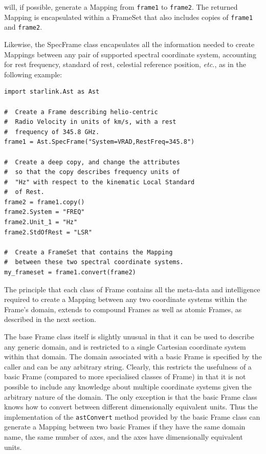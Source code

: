 \documentclass[final,authoryear,5p,times,twocolumn]{elsarticle}
\begin{document}
will, if possible, generate a Mapping from \texttt{frame1} to
\texttt{frame2}. The returned Mapping is encapsulated within a FrameSet that
also includes copies of \texttt{frame1} and \texttt{frame2}.

Likewise, the SpecFrame class encapsulates all the information needed to
create Mappings between any pair of supported spectral coordinate system,
accounting for rest frequency, standard of rest, celestial reference position,
\emph{etc.}, as in the following example:

\begin{lstlisting}
import starlink.Ast as Ast

#  Create a Frame describing helio-centric
#  Radio Velocity in units of km/s, with a rest
#  frequency of 345.8 GHz.
frame1 = Ast.SpecFrame("System=VRAD,RestFreq=345.8")

#  Create a deep copy, and change the attributes
#  so that the copy describes frequency units of
#  "Hz" with respect to the kinematic Local Standard
#  of Rest.
frame2 = frame1.copy()
frame2.System = "FREQ"
frame2.Unit_1 = "Hz"
frame2.StdOfRest = "LSR"

#  Create a FrameSet that contains the Mapping
#  between these two spectral coordinate systems.
my_frameset = frame1.convert(frame2)
\end{lstlisting}

The principle that each class of Frame contains all the meta-data and
intelligence required to create a Mapping between any two coordinate
systems within the Frame's domain, extends to compound Frames as well as
atomic Frames, as described in the next section.

The base Frame class itself is slightly unusual in that it can be used to
describe any generic domain, and is restricted to a single Cartesian
coordinate system within that domain. The domain associated with a basic
Frame is specified by the caller and can be any arbitrary string. Clearly,
this restricts the usefulness of a basic Frame (compared to more
specialised classes of Frame) in that it is not possible to include any
knowledge about multiple coordinate systems given the arbitrary nature of
the domain. The only exception is that the basic Frame class
knows how to convert between different dimensionally equivalent units.
Thus the implementation of the \texttt{astConvert} method provided by the
basic Frame class can generate a Mapping between two basic Frames if they
have the same domain name, the same number of axes, and the axes have
dimensionally equivalent units.
\end{document}

